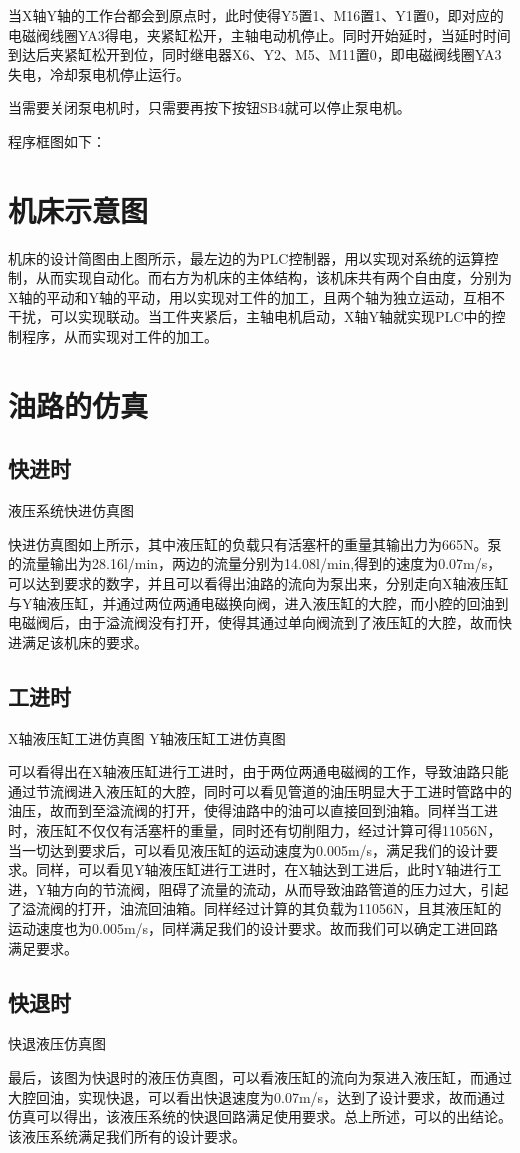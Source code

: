 当X轴Y轴的工作台都会到原点时，此时使得Y5置1、M16置1、Y1置0，即对应的电磁阀线圈YA3得电，夹紧缸松开，主轴电动机停止。同时开始延时，当延时时间到达后夹紧缸松开到位，同时继电器X6、Y2、M5、M11置0，即电磁阀线圈YA3失电，冷却泵电机停止运行。

当需要关闭泵电机时，只需要再按下按钮SB4就可以停止泵电机。

程序框图如下：
\clearpage

\clearpage
\section{机床示意图}
机床的设计简图由上图所示，最左边的为PLC控制器，用以实现对系统的运算控制，从而实现自动化。而右方为机床的主体结构，该机床共有两个自由度，分别为X轴的平动和Y轴的平动，用以实现对工件的加工，且两个轴为独立运动，互相不干扰，可以实现联动。当工件夹紧后，主轴电机启动，X轴Y轴就实现PLC中的控制程序，从而实现对工件的加工。

\section{油路的仿真}
\subsection{快进时}
液压系统快进仿真图

快进仿真图如上所示，其中液压缸的负载只有活塞杆的重量其输出力为665N。泵的流量输出为28.16l/min，两边的流量分别为14.08l/min,得到的速度为0.07m/s，可以达到要求的数字，并且可以看得出油路的流向为泵出来，分别走向X轴液压缸与Y轴液压缸，并通过两位两通电磁换向阀，进入液压缸的大腔，而小腔的回油到电磁阀后，由于溢流阀没有打开，使得其通过单向阀流到了液压缸的大腔，故而快进满足该机床的要求。
\subsection{工进时}
X轴液压缸工进仿真图                              Y轴液压缸工进仿真图


可以看得出在X轴液压缸进行工进时，由于两位两通电磁阀的工作，导致油路只能通过节流阀进入液压缸的大腔，同时可以看见管道的油压明显大于工进时管路中的油压，故而到至溢流阀的打开，使得油路中的油可以直接回到油箱。同样当工进时，液压缸不仅仅有活塞杆的重量，同时还有切削阻力，经过计算可得11056N，当一切达到要求后，可以看见液压缸的运动速度为0.005m/s，满足我们的设计要求。同样，可以看见Y轴液压缸进行工进时，在X轴达到工进后，此时Y轴进行工进，Y轴方向的节流阀，阻碍了流量的流动，从而导致油路管道的压力过大，引起了溢流阀的打开，油流回油箱。同样经过计算的其负载为11056N，且其液压缸的运动速度也为0.005m/s，同样满足我们的设计要求。故而我们可以确定工进回路满足要求。
\subsection{快退时}
快退液压仿真图

最后，该图为快退时的液压仿真图，可以看液压缸的流向为泵进入液压缸，而通过大腔回油，实现快退，可以看出快退速度为0.07m/s，达到了设计要求，故而通过仿真可以得出，该液压系统的快退回路满足使用要求。总上所述，可以的出结论。该液压系统满足我们所有的设计要求。

